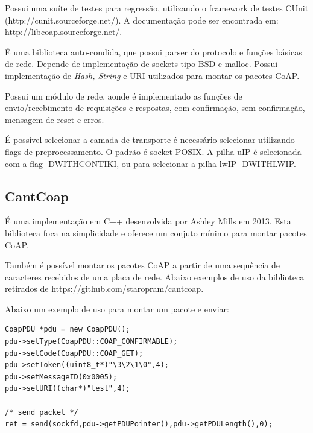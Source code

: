 Possui uma su\'ite de testes para regress\~ao, utilizando o framework de testes CUnit (http://cunit.sourceforge.net/). A documenta\c{c}\~ao pode ser encontrada em: http://libcoap.sourceforge.net/.

\'E uma biblioteca auto-condida, que possui parser do protocolo e fun\c{c}\~oes b\'asicas de rede. Depende de implementa\c{c}\~ao de sockets tipo BSD e malloc. Possui implementa\c{c}\~ao de \textit{Hash, String} e URI utilizados para montar os pacotes CoAP.

Possui um m\'odulo de rede, aonde \'e implementado as fun\c{c}\~oes de envio/recebimento de requisi\c{c}\~oes e respostas, com confirma\c{c}\~ao, sem confirma\c{c}\~ao, mensagem de reset e erros.

\'E poss\'ivel selecionar a camada de transporte \'e necess\'ario selecionar utilizando flags de preprocessamento. O padr\~ao \'e socket POSIX. A pilha uIP \'e selecionada com a flag -DWITH\textunderscore CONTIKI, ou para selecionar a pilha lwIP -DWITH\textunderscore LWIP.

\subsection{CantCoap}
\'E uma implementa\c{c}\~ao em C++ desenvolvida por Ashley Mills em 2013. Esta biblioteca foca na simplicidade e oferece um conjuto m\'inimo para montar pacotes CoAP.

Tamb\'em \'e poss\'ivel montar os pacotes CoAP a partir de uma sequ\^encia de caracteres recebidos de uma placa de rede. Abaixo exemplos de uso da biblioteca retirados de https://github.com/staropram/cantcoap.


\lstset{escapechar=@,style=customc}

Abaixo um exemplo de uso para montar um pacote e enviar:

\begin{lstlisting}
CoapPDU *pdu = new CoapPDU();
pdu->setType(CoapPDU::COAP_CONFIRMABLE);
pdu->setCode(CoapPDU::COAP_GET);
pdu->setToken((uint8_t*)"\3\2\1\0",4);
pdu->setMessageID(0x0005);
pdu->setURI((char*)"test",4);

/* send packet */
ret = send(sockfd,pdu->getPDUPointer(),pdu->getPDULength(),0);
\end{lstlisting}

